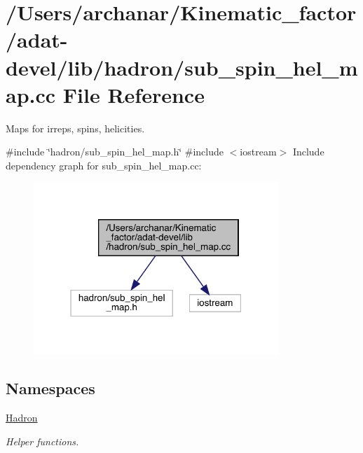 \hypertarget{adat-devel_2lib_2hadron_2sub__spin__hel__map_8cc}{}\section{/\+Users/archanar/\+Kinematic\+\_\+factor/adat-\/devel/lib/hadron/sub\+\_\+spin\+\_\+hel\+\_\+map.cc File Reference}
\label{adat-devel_2lib_2hadron_2sub__spin__hel__map_8cc}


Maps for irreps, spins, helicities.  


{\ttfamily \#include \char`\"{}hadron/sub\+\_\+spin\+\_\+hel\+\_\+map.\+h\char`\"{}}\newline
{\ttfamily \#include $<$iostream$>$}\newline
Include dependency graph for sub\+\_\+spin\+\_\+hel\+\_\+map.\+cc\+:
\nopagebreak
\begin{figure}[H]
\begin{center}
\leavevmode
\includegraphics[width=262pt]{dd/d3f/adat-devel_2lib_2hadron_2sub__spin__hel__map_8cc__incl}
\end{center}
\end{figure}
\subsection*{Namespaces}
\begin{DoxyCompactItemize}
\item 
 \mbox{\hyperlink{namespaceHadron}{Hadron}}
\begin{DoxyCompactList}\small\item\em Helper functions. \end{DoxyCompactList}\end{DoxyCompactItemize}
